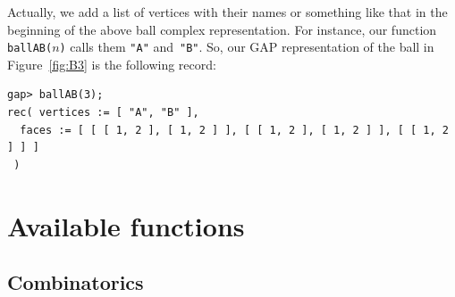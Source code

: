 \documentclass{article}
\begin{document}
Actually, we add a list of vertices with their names or something like that in the beginning of the above ball complex representation. For instance, our function \verb|ballAB(|$n$\verb|)| calls them \verb|"A"| and~\verb|"B"|. So, our GAP representation of the ball in Figure~\ref{fig:B3} is the following record:
\begin{verbatim}
gap> ballAB(3);  
rec( vertices := [ "A", "B" ], 
  faces := [ [ [ 1, 2 ], [ 1, 2 ] ], [ [ 1, 2 ], [ 1, 2 ] ], [ [ 1, 2 ] ] ] 
 )
\end{verbatim}


\section{Available functions}

\subsection{Combinatorics}
\end{document}

